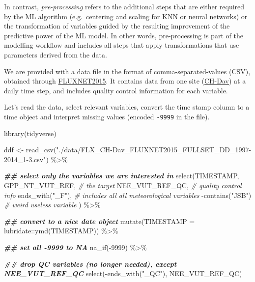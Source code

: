 \documentclass[
]{book}
\newenvironment{Shaded}{\begin{snugshade}}{\end{snugshade}}
\newcommand{\AttributeTok}[1]{\textcolor[rgb]{0.77,0.63,0.00}{#1}}
\newcommand{\CommentTok}[1]{\textcolor[rgb]{0.56,0.35,0.01}{\textit{#1}}}
\newcommand{\DecValTok}[1]{\textcolor[rgb]{0.00,0.00,0.81}{#1}}
\newcommand{\DocumentationTok}[1]{\textcolor[rgb]{0.56,0.35,0.01}{\textbf{\textit{#1}}}}
\newcommand{\FunctionTok}[1]{\textcolor[rgb]{0.00,0.00,0.00}{#1}}
\newcommand{\NormalTok}[1]{#1}
\newcommand{\OtherTok}[1]{\textcolor[rgb]{0.56,0.35,0.01}{#1}}
\newcommand{\SpecialCharTok}[1]{\textcolor[rgb]{0.00,0.00,0.00}{#1}}
\newcommand{\StringTok}[1]{\textcolor[rgb]{0.31,0.60,0.02}{#1}}
\begin{document}
In contrast, \emph{pre-processing} refers to the additional steps that are either required by the ML algorithm (e.g.~centering and scaling for KNN or neural networks) or the transformation of variables guided by the resulting improvement of the predictive power of the ML model. In other words, pre-processing is part of the modelling workflow and includes all steps that apply transformations that use parameters derived from the data.

We are provided with a data file in the format of comma-separated-values (CSV), obtained through \href{https://fluxnet.org/data/fluxnet2015-dataset/}{FLUXNET2015}. It contains data from one site (\href{https://gl.ethz.ch/infrastructure/sites/davos.html}{CH-Dav}) at a daily time step, and includes quality control information for each variable.

Let's read the data, select relevant variables, convert the time stamp column to a time object and interpret missing values (encoded \texttt{-9999} in the file).

\begin{Shaded}
\begin{Highlighting}[]
\FunctionTok{library}\NormalTok{(tidyverse)}

\NormalTok{ddf }\OtherTok{\textless{}{-}} \FunctionTok{read\_csv}\NormalTok{(}\StringTok{"./data/FLX\_CH{-}Dav\_FLUXNET2015\_FULLSET\_DD\_1997{-}2014\_1{-}3.csv"}\NormalTok{) }\SpecialCharTok{\%\textgreater{}\%} 
  
  \DocumentationTok{\#\# select only the variables we are interested in}
  \FunctionTok{select}\NormalTok{(TIMESTAMP,}
\NormalTok{         GPP\_NT\_VUT\_REF,    }\CommentTok{\# the target}
\NormalTok{         NEE\_VUT\_REF\_QC,    }\CommentTok{\# quality control info}
         \FunctionTok{ends\_with}\NormalTok{(}\StringTok{"\_F"}\NormalTok{),   }\CommentTok{\# includes all all meteorological variables}
         \SpecialCharTok{{-}}\FunctionTok{contains}\NormalTok{(}\StringTok{"JSB"}\NormalTok{)   }\CommentTok{\# weird useless variable}
\NormalTok{         ) }\SpecialCharTok{\%\textgreater{}\%}

  \DocumentationTok{\#\# convert to a nice date object}
  \FunctionTok{mutate}\NormalTok{(}\AttributeTok{TIMESTAMP =}\NormalTok{ lubridate}\SpecialCharTok{::}\FunctionTok{ymd}\NormalTok{(TIMESTAMP)) }\SpecialCharTok{\%\textgreater{}\%}

  \DocumentationTok{\#\# set all {-}9999 to NA}
  \FunctionTok{na\_if}\NormalTok{(}\SpecialCharTok{{-}}\DecValTok{9999}\NormalTok{) }\SpecialCharTok{\%\textgreater{}\%}

  \DocumentationTok{\#\# drop QC variables (no longer needed), except NEE\_VUT\_REF\_QC}
  \FunctionTok{select}\NormalTok{(}\SpecialCharTok{{-}}\FunctionTok{ends\_with}\NormalTok{(}\StringTok{"\_QC"}\NormalTok{), NEE\_VUT\_REF\_QC)}
\end{Highlighting}
\end{Shaded}
\end{document}
